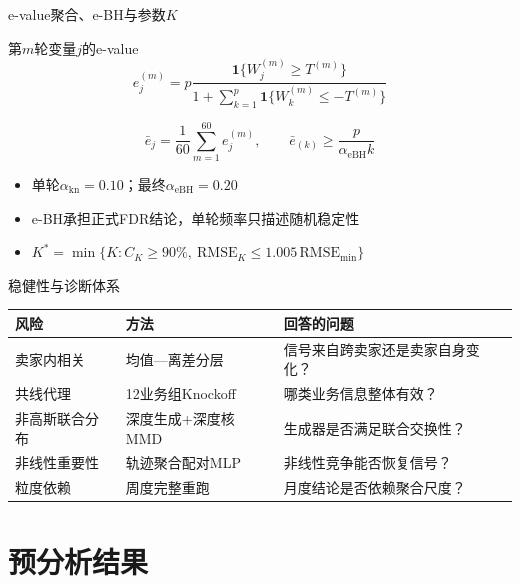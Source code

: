 \documentclass[aspectratio=169]{beamer}
\begin{document}
\begin{frame}[shrink=10]{e-value聚合、e-BH与参数$K$}
  \begin{block}{第$m$轮变量$j$的e-value}
    \begin{equation*}
      e_j^{(m)}
      =p\frac{\mathbf 1\{W_j^{(m)}\ge T^{(m)}\}}
      {1+\sum_{k=1}^{p}\mathbf 1\{W_k^{(m)}\le-T^{(m)}\}}
    \end{equation*}
  \end{block}
  \begin{equation*}
    \bar e_j=\frac{1}{60}\sum_{m=1}^{60}e_j^{(m)},\qquad
    \bar e_{(k)}\ge\frac{p}{\alpha_{\mathrm{eBH}}k}
  \end{equation*}
  \begin{itemize}
    \item 单轮$\alpha_{\mathrm{kn}}=0.10$；最终$\alpha_{\mathrm{eBH}}=0.20$
    \item e-BH承担正式FDR结论，单轮频率只描述随机稳定性
    \item $K^*=\min\{K:C_K\ge90\%,\ \mathrm{RMSE}_K\le1.005\,\mathrm{RMSE}_{\min}\}$
  \end{itemize}
\end{frame}

\begin{frame}{稳健性与诊断体系}
  \begin{table}
    \centering
    \small
    \begin{tabular}{p{}p{}p{}}
      \toprule
      风险 & 方法 & 回答的问题 \\
      \midrule
      卖家内相关 & 均值—离差分层 & 信号来自跨卖家还是卖家自身变化？ \\
      共线代理 & 12业务组Knockoff & 哪类业务信息整体有效？ \\
      非高斯联合分布 & 深度生成+深度核MMD & 生成器是否满足联合交换性？ \\
      非线性重要性 & 轨迹聚合配对MLP & 非线性竞争能否恢复信号？ \\
      粒度依赖 & 周度完整重跑 & 月度结论是否依赖聚合尺度？ \\
      \bottomrule
    \end{tabular}
  \end{table}
\end{frame}

\section{预分析结果}
\end{document}
